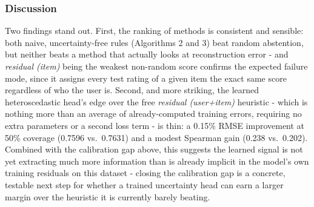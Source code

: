\begin{table}[htbp]
\centering
\caption{Selective RMSE vs.\ coverage, all six abstention rules plus oracle}
\label{tab:autorec2-selective}
\end{table}

\subsubsection{Discussion}

Two findings stand out. First, the ranking of methods is consistent and
sensible: both naive, uncertainty-free rules (Algorithms 2 and 3) beat
random abstention, but neither beats a method that actually looks at
reconstruction error - and \emph{residual (item)} being the weakest
non-random score confirms the expected failure mode, since it assigns every
test rating of a given item the exact same score regardless of who the user
is. Second, and more striking, the learned heteroscedastic head's edge over
the free \emph{residual (user+item)} heuristic - which is nothing more than
an average of already-computed training errors, requiring no extra
parameters or a second loss term - is thin: a 0.15\% RMSE improvement at 50\%
coverage (0.7596 vs.\ 0.7631) and a modest Spearman gain (0.238 vs.\ 0.202).
Combined with the calibration gap above, this suggests the learned signal is
not yet extracting much more information than is already implicit in the
model's own training residuals on this dataset - closing the calibration gap
is a concrete, testable next step for whether a trained uncertainty head can
earn a larger margin over the heuristic it is currently barely beating.
